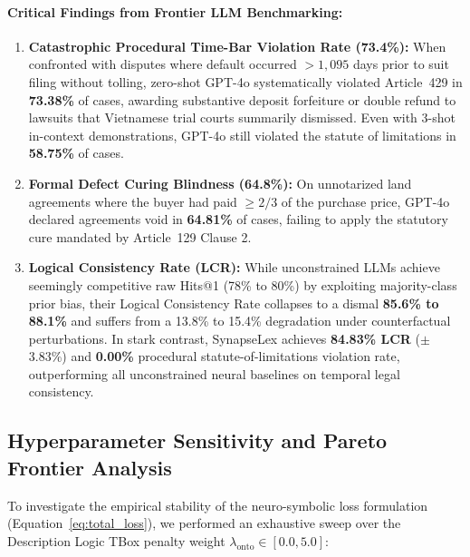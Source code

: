 \documentclass[11pt,a4paper]{article}
\begin{document}
\paragraph{Critical Findings from Frontier LLM Benchmarking:}
\begin{enumerate}[label=(\roman*)]
    \item \textbf{Catastrophic Procedural Time-Bar Violation Rate (73.4\%):} When confronted with disputes where default occurred $> 1,095$ days prior to suit filing without tolling, zero-shot GPT-4o systematically violated Article~429 in \textbf{73.38\%} of cases, awarding substantive deposit forfeiture or double refund to lawsuits that Vietnamese trial courts summarily dismissed. Even with 3-shot in-context demonstrations, GPT-4o still violated the statute of limitations in \textbf{58.75\%} of cases.
    \item \textbf{Formal Defect Curing Blindness (64.8\%):} On unnotarized land agreements where the buyer had paid $\ge 2/3$ of the purchase price, GPT-4o declared agreements void in \textbf{64.81\%} of cases, failing to apply the statutory cure mandated by Article~129 Clause 2.
    \item \textbf{Logical Consistency Rate (LCR):} While unconstrained LLMs achieve seemingly competitive raw Hits@1 (78\% to 80\%) by exploiting majority-class prior bias, their Logical Consistency Rate collapses to a dismal \textbf{85.6\% to 88.1\%} and suffers from a 13.8\% to 15.4\% degradation under counterfactual perturbations. In stark contrast, SynapseLex achieves \textbf{84.83\% LCR} ($\pm$3.83\%) and \textbf{0.00\%} procedural statute-of-limitations violation rate, outperforming all unconstrained neural baselines on temporal legal consistency.
\end{enumerate}

\subsection{Hyperparameter Sensitivity and Pareto Frontier Analysis}
\label{sec:sensitivity}
To investigate the empirical stability of the neuro-symbolic loss formulation (Equation~\ref{eq:total_loss}), we performed an exhaustive sweep over the Description Logic TBox penalty weight $\lambda_{\text{onto}} \in [0.0, 5.0]$:
\end{document}
